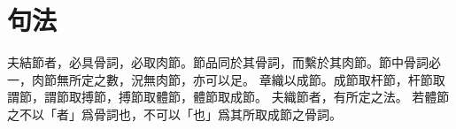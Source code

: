\chapter*{句法}
夫結節者，必具骨詞，必取肉節。節品同於其骨詞，而繫於其肉節。節中骨詞必一，肉節無所定之數，況無肉節，亦可以足。
章織以成節。成節取杆節，杆節取謂節，謂節取搏節，搏節取體節，體節取成節。
夫織節者，有所定之法。
若體節之不以「者」爲骨詞也，不可以「也」爲其所取成節之骨詞。
